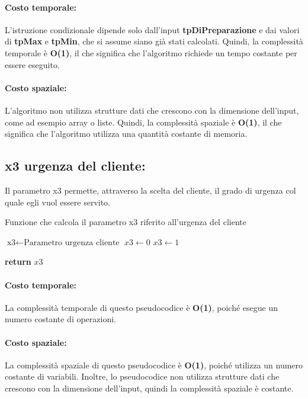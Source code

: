 \paragraph{Costo temporale:}
L'istruzione condizionale dipende solo dall'input \textbf{tpDiPreparazione} e dai valori di \textbf{tpMax} e \textbf{tpMin}, che si assume siano già stati calcolati. Quindi, la complessità temporale è \textbf{O(1)}, il che significa che l'algoritmo richiede un tempo costante per essere eseguito.

\paragraph{Costo spaziale:}
L'algoritmo non utilizza strutture dati che crescono con la dimensione dell'input, come ad esempio array o liste. Quindi, la complessità spaziale è \textbf{O(1)}, il che significa che l'algoritmo utilizza una quantità costante di memoria.

\subsection{x3 urgenza del cliente:}
Il  parametro x3 permette, attraverso la scelta del cliente, il grado di urgenza col quale egli vuol essere servito.
\begin{algorithm}[h]
	\begin{algorithmic}[h!]
		\caption{Funzione che calcola il parametro x3 riferito all'urgenza del cliente}
		\medskip
		\State $\text{x3} \gets \text{Parametro urgenza cliente}$
		\medskip
		\State $x3 \gets 0$  
		\State $x3 \gets 1$  
		\EndIf
		
		\State \textbf{return} $x3$
		\EndFunction
	\end{algorithmic}
\end{algorithm}

\paragraph{Costo temporale:}
La complessità temporale di questo pseudocodice è \textbf{O(1)}, poiché esegue un numero costante di operazioni.

\paragraph{Costo spaziale:}
La complessità spaziale di questo pseudocodice è \textbf{O(1)}, poiché utilizza un numero costante di variabili. Inoltre, lo pseudocodice non utilizza strutture dati che crescono con la dimensione dell'input, quindi la complessità spaziale è costante.

